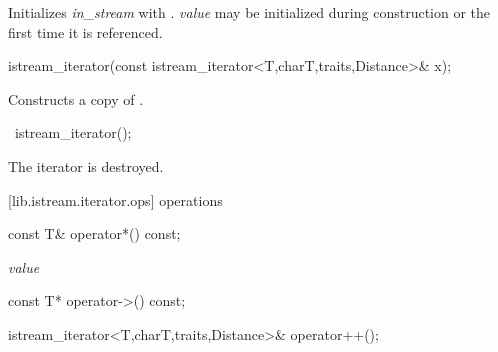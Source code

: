 \begin{itemdescr}
\pnum
\effects
Initializes \textit{in_stream} with . \textit{value} may be initialized during
construction or the first time it is referenced.
\end{itemdescr}


%
\begin{itemdecl}
istream_iterator(const istream_iterator<T,charT,traits,Distance>& x);
\end{itemdecl}

\begin{itemdescr}
\pnum
\effects
Constructs a copy of .
\end{itemdescr}

%
\begin{itemdecl}
~istream_iterator();
\end{itemdecl}

\begin{itemdescr}
\pnum
\effects
The iterator is destroyed.
\end{itemdescr}

[lib.istream.iterator.ops]{ operations}

%
%
\begin{itemdecl}
const T& operator*() const;
\end{itemdecl}

\begin{itemdescr}
\pnum
\returns
\textit{value}
\end{itemdescr}

%
%
\begin{itemdecl}
const T* operator->() const;
\end{itemdecl}

\begin{itemdescr}
\pnum
\returns
{}
\end{itemdescr}

%
%
\begin{itemdecl}
istream_iterator<T,charT,traits,Distance>& operator++();
\end{itemdecl}

